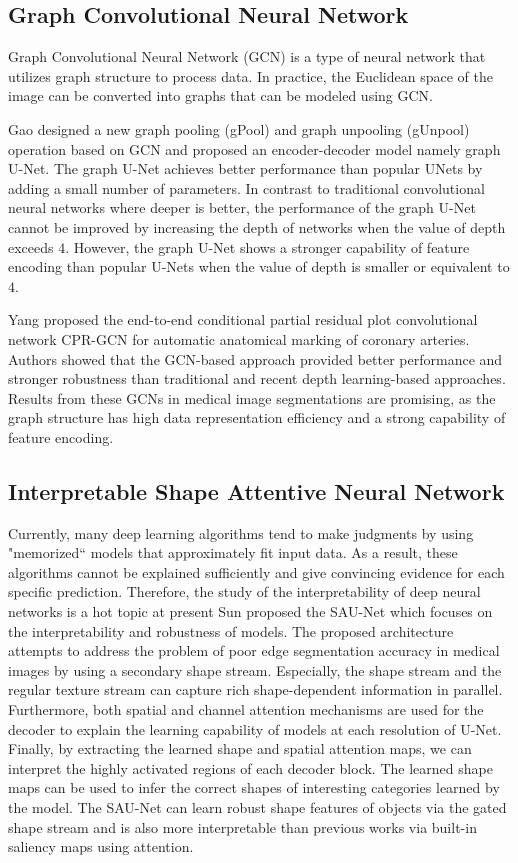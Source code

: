 \subsection{Graph Convolutional Neural Network}
Graph Convolutional Neural Network (GCN) is a type of neural network that
utilizes graph structure to process data. In practice, the Euclidean space of
the image can be converted into graphs that can be modeled using GCN.

Gao \etal \cite{gao2019graph} designed a new graph pooling (gPool) and graph
unpooling (gUnpool) operation based on GCN and proposed an encoder-decoder model
namely graph U-Net. The graph U-Net achieves better performance than popular
UNets by adding a small number of parameters. In contrast to traditional
convolutional neural networks where deeper is better, the performance of the
graph U-Net cannot be improved by increasing the depth of networks when the
value of depth exceeds $4$. However, the graph U-Net shows a stronger capability
of feature encoding than popular U-Nets when the value of depth is smaller or
equivalent to $4$.

Yang \etal \cite{yang2020cpr} proposed the end-to-end conditional partial
residual plot convolutional network CPR-GCN for automatic anatomical marking of
coronary arteries. Authors showed that the GCN-based approach provided better
performance and stronger robustness than traditional and recent depth
learning-based approaches. Results from these GCNs in medical image
segmentations are promising, as the graph structure has high data representation
efficiency and a strong capability of feature encoding.

\subsection{Interpretable Shape Attentive Neural Network}
Currently, many deep learning algorithms tend to make judgments by using
"memorized`` models that approximately fit input data. As a result, these
algorithms cannot be explained sufficiently and give convincing evidence for
each specific prediction. Therefore, the study of the interpretability of deep
neural networks is a hot topic at present
Sun \etal \cite{sun2020saunet} proposed the SAU-Net which focuses on the
interpretability and robustness of models. The proposed architecture attempts to
address the problem of poor edge segmentation accuracy in medical images by
using a secondary shape stream. Especially, the shape stream and the regular
texture stream can capture rich shape-dependent information in parallel.
Furthermore, both spatial and channel attention mechanisms are used for the
decoder to explain the learning capability of models at each resolution of
U-Net. Finally, by extracting the learned shape and spatial attention maps, we
can interpret the highly activated regions of each decoder block. The learned
shape maps can be used to infer the correct shapes of interesting categories
learned by the model. The SAU-Net can learn robust shape features of objects via
the gated shape stream and is also more interpretable than previous works via
built-in saliency maps using attention.

